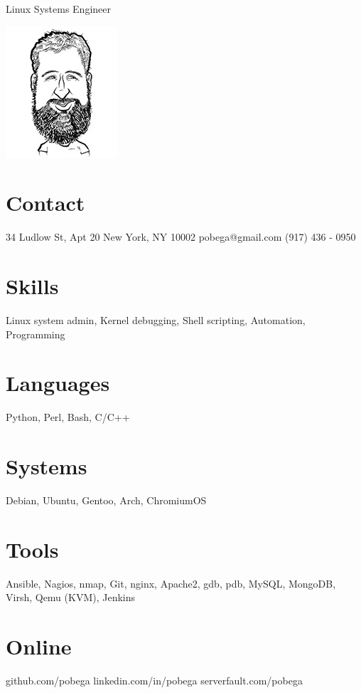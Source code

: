 \documentclass[]{resume}
\begin{document}
\graphicspath{ {images/} }

       {Linux Systems Engineer}


\begin{aside}
  \includegraphics{caricaturesmall}
  \section{Contact}
    34 Ludlow St, Apt 20
    New York, NY 10002
    pobega@gmail.com
    (917) 436 - 0950
  \section{Skills}
    Linux system admin, 
    Kernel debugging,
    Shell scripting, Automation, Programming
  \section{Languages}
    Python, Perl, Bash,
    C/C++
  \section{Systems}
    Debian, Ubuntu, Gentoo,
    Arch, ChromiumOS
  \section{Tools}
	Ansible, Nagios, nmap, Git, nginx, Apache2, gdb, pdb, MySQL, MongoDB, Virsh, Qemu (KVM), Jenkins
  \section{Online}
    github.com/{\bodyfontbold pobega}
    linkedin.com/in/{\bodyfontbold pobega}
    serverfault.com/{\bodyfontbold pobega}
\end{aside}
\end{document}
